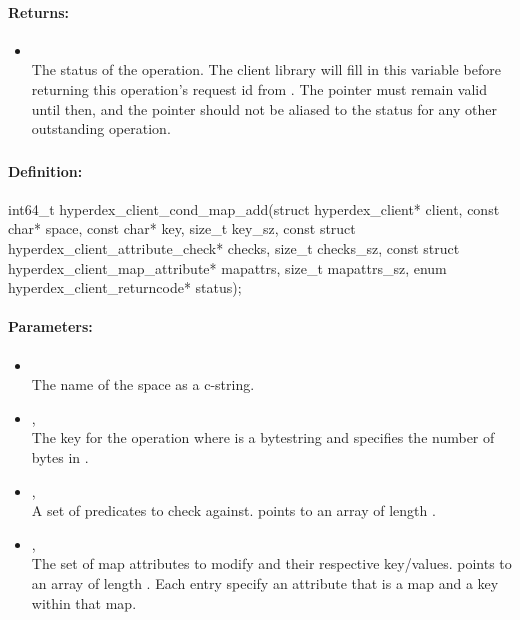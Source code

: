 \paragraph{Returns:}
\begin{itemize}[noitemsep]
\item {}\\
The status of the operation.  The client library will fill in this variable before returning this operation's request id from .  The pointer must remain valid until then, and the pointer should not be aliased to the status for any other outstanding operation.
\end{itemize}

\pagebreak
\subsubsection{}
\label{api:c:cond_map_add}


\paragraph{Definition:}
\begin{ccode}
int64_t hyperdex_client_cond_map_add(struct hyperdex_client* client,
        const char* space,
        const char* key, size_t key_sz,
        const struct hyperdex_client_attribute_check* checks, size_t checks_sz,
        const struct hyperdex_client_map_attribute* mapattrs, size_t mapattrs_sz,
        enum hyperdex_client_returncode* status);
\end{ccode}

\paragraph{Parameters:}
\begin{itemize}[noitemsep]
\item {}\\
The name of the space as a c-string.
\item {}, \\
The key for the operation where  is a bytestring and  specifies the number of bytes in .
\item {}, \\
A set of predicates to check against.   points to an array of length .
\item {}, \\
The set of map attributes to modify and their respective key/values.   points to an array of length .  Each entry specify an attribute that is a map and a key within that map.
\end{itemize}

